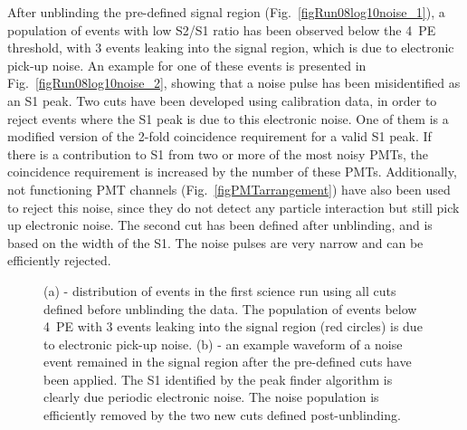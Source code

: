 After unblinding the pre-defined signal region (Fig.~\ref{figRun08log10noise_1}), a population of events with low S2/S1 ratio has been observed below the 4~PE threshold, with 3 events leaking into the signal region, which is due to electronic pick-up noise. An example for one of these events is presented in Fig.~\ref{figRun08log10noise_2}, showing that a noise pulse has been misidentified as an S1 peak. Two cuts have been developed using calibration data, in order to reject events where the S1 peak is due to this electronic noise. One of them is a modified version of the 2-fold coincidence requirement for a valid S1 peak. If there is a contribution to S1 from two or more of the most noisy PMTs, the coincidence requirement is increased by the number of these PMTs. Additionally, not functioning PMT channels (Fig.~\ref{figPMTarrangement}) have also been used to reject this noise, since they do not detect any particle interaction but still pick up electronic noise. The second cut has been defined after unblinding, and is based on the width of the S1. The noise pulses are very narrow and can be efficiently rejected. 

\begin{figure}[!t]
\centering
{}
\caption[Distribution of events in the first science run using all cuts defined before unblinding the data]{(a) - distribution of events in the first science run using all cuts defined before unblinding the data. The population of events below 4~PE with 3 events leaking into the signal region (red circles) is due to electronic pick-up noise. 
(b) - an example waveform of a noise event remained in the signal region after the pre-defined cuts have been applied. The S1 identified by the peak finder algorithm is clearly due periodic electronic noise. The noise population is efficiently removed by the two new cuts defined post-unblinding.}
\label{figRun08log10noise}
\end{figure}

